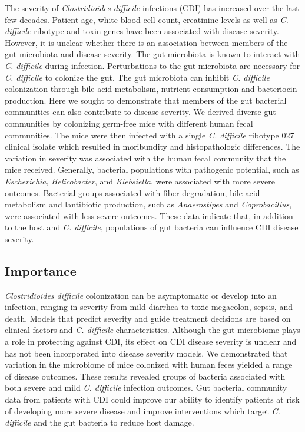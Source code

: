 \documentclass[
  12pt,
]{article}
\begin{document}
The severity of \emph{Clostridioides difficile} infections (CDI) has
increased over the last few decades. Patient age, white blood cell
count, creatinine levels as well as \emph{C. difficile} ribotype and
toxin genes have been associated with disease severity. However, it is
unclear whether there is an association between members of the gut
microbiota and disease severity. The gut microbiota is known to interact
with \emph{C. difficile} during infection. Perturbations to the gut
microbiota are necessary for \emph{C. difficile} to colonize the gut.
The gut microbiota can inhibit \emph{C. difficile} colonization through
bile acid metabolism, nutrient consumption and bacteriocin production.
Here we sought to demonstrate that members of the gut bacterial
communities can also contribute to disease severity. We derived diverse
gut communities by colonizing germ-free mice with different human fecal
communities. The mice were then infected with a single \emph{C.
difficile} ribotype 027 clinical isolate which resulted in moribundity
and histopathologic differences. The variation in severity was
associated with the human fecal community that the mice received.
Generally, bacterial populations with pathogenic potential, such as
\emph{Escherichia}, \emph{Helicobacter}, and \emph{Klebsiella}, were
associated with more severe outcomes. Bacterial groups associated with
fiber degradation, bile acid metabolism and lantibiotic production, such
as \emph{Anaerostipes} and \emph{Coprobacillus}, were associated with
less severe outcomes. These data indicate that, in addition to the host
and \emph{C. difficile}, populations of gut bacteria can influence CDI
disease severity.

\hypertarget{importance}{%
\subsection{Importance}\label{importance}}

\emph{Clostridioides difficile} colonization can be asymptomatic or
develop into an infection, ranging in severity from mild diarrhea to
toxic megacolon, sepsis, and death. Models that predict severity and
guide treatment decisions are based on clinical factors and \emph{C.
difficile} characteristics. Although the gut microbiome plays a role in
protecting against CDI, its effect on CDI disease severity is unclear
and has not been incorporated into disease severity models. We
demonstrated that variation in the microbiome of mice colonized with
human feces yielded a range of disease outcomes. These results revealed
groups of bacteria associated with both severe and mild \emph{C.
difficile} infection outcomes. Gut bacterial community data from
patients with CDI could improve our ability to identify patients at risk
of developing more severe disease and improve interventions which target
\emph{C. difficile} and the gut bacteria to reduce host damage.
\end{document}
